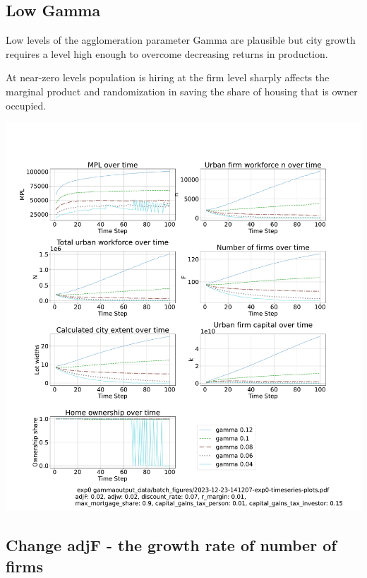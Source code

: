 \documentclass{article}
\begin{document}
\newpage %

\subsection{Low Gamma}
Low levels of the agglomeration parameter Gamma are plausible but city growth requires a level high enough to overcome decreasing returns in production.

At near-zero levels population is hiring at the firm level sharply affects  the marginal product and randomization in saving the share of housing that is owner occupied.
 

 \hspace*{-2.5cm}\includegraphics[trim= 1.5cm 3.65cm 2cm 4.0cm, clip, scale=.3]{fig/Analysis/Gamma-low-5-30.pdf}

\newpage %

\subsection{Change adjF - the growth rate of number of firms }
\end{document}
